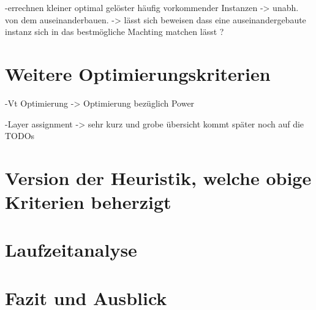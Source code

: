 \documentclass[11pt, a4paper, german]{article}
\begin{document}
	-errechnen kleiner optimal gelöster häufig vorkommender Instanzen -> unabh. von dem auseinanderbauen.  -> lässt sich beweisen dass eine auseinandergebaute instanz sich in das bestmögliche Machting matchen lässt ? 
	

\section{Weitere Optimierungskriterien}
	-Vt Optimierung -> Optimierung bezüglich Power
	
	-Layer assignment -> sehr kurz und grobe übersicht kommt später noch auf die TODOs 
	
	
\section{Version der Heuristik, welche obige Kriterien beherzigt}

\section{Laufzeitanalyse}

\section{Fazit und Ausblick}
	







\newpage
\end{document}
